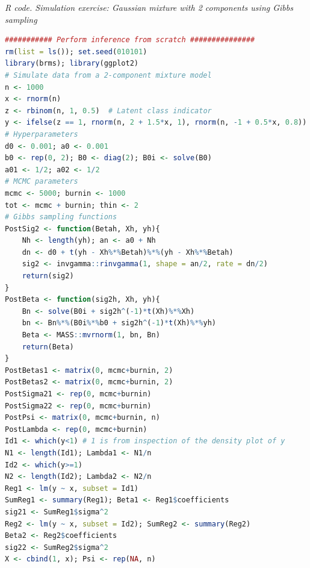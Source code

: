 \begin{tcolorbox}[enhanced,width=4.67in,center upper,
	fontupper=\large\bfseries,drop shadow southwest,sharp corners]
	\textit{R code. Simulation exercise: Gaussian mixture with 2 components using Gibbs sampling}
	\begin{VF}
		\begin{lstlisting}[language=R]
########### Perform inference from scratch ###############
rm(list = ls()); set.seed(010101)
library(brms); library(ggplot2)
# Simulate data from a 2-component mixture model
n <- 1000
x <- rnorm(n)
z <- rbinom(n, 1, 0.5)  # Latent class indicator
y <- ifelse(z == 1, rnorm(n, 2 + 1.5*x, 1), rnorm(n, -1 + 0.5*x, 0.8))
# Hyperparameters
d0 <- 0.001; a0 <- 0.001
b0 <- rep(0, 2); B0 <- diag(2); B0i <- solve(B0)
a01 <- 1/2; a02 <- 1/2
# MCMC parameters
mcmc <- 5000; burnin <- 1000
tot <- mcmc + burnin; thin <- 2
# Gibbs sampling functions
PostSig2 <- function(Betah, Xh, yh){
	Nh <- length(yh); an <- a0 + Nh
	dn <- d0 + t(yh - Xh%*%Betah)%*%(yh - Xh%*%Betah)
	sig2 <- invgamma::rinvgamma(1, shape = an/2, rate = dn/2)
	return(sig2)
}
PostBeta <- function(sig2h, Xh, yh){
	Bn <- solve(B0i + sig2h^(-1)*t(Xh)%*%Xh)
	bn <- Bn%*%(B0i%*%b0 + sig2h^(-1)*t(Xh)%*%yh)
	Beta <- MASS::mvrnorm(1, bn, Bn)
	return(Beta)
}
PostBetas1 <- matrix(0, mcmc+burnin, 2)
PostBetas2 <- matrix(0, mcmc+burnin, 2)
PostSigma21 <- rep(0, mcmc+burnin)
PostSigma22 <- rep(0, mcmc+burnin)
PostPsi <- matrix(0, mcmc+burnin, n)
PostLambda <- rep(0, mcmc+burnin)
Id1 <- which(y<1) # 1 is from inspection of the density plot of y 
N1 <- length(Id1); Lambda1 <- N1/n
Id2 <- which(y>=1)
N2 <- length(Id2); Lambda2 <- N2/n
Reg1 <- lm(y ~ x, subset = Id1)
SumReg1 <- summary(Reg1); Beta1 <- Reg1$coefficients
sig21 <- SumReg1$sigma^2 
Reg2 <- lm(y ~ x, subset = Id2); SumReg2 <- summary(Reg2)
Beta2 <- Reg2$coefficients
sig22 <- SumReg2$sigma^2
X <- cbind(1, x); Psi <- rep(NA, n)
\end{lstlisting}
	\end{VF}
\end{tcolorbox}
 
